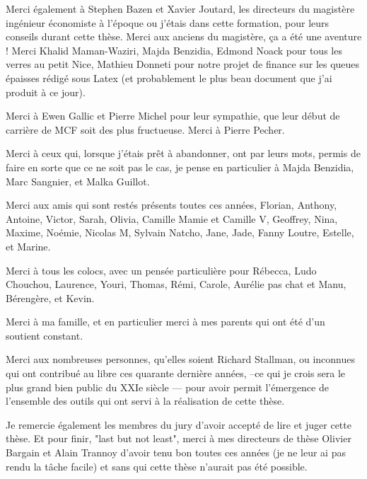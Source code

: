 \medskip


Merci également à Stephen Bazen et Xavier Joutard, les directeurs du magistère ingénieur économiste à l’époque ou j’étais dans cette formation, pour leurs conseils durant cette thèse. Merci aux anciens du magistère, ça a été une aventure ! Merci  Khalid Maman-Waziri,  Majda Benzidia, Edmond Noack pour tous les verres au petit Nice, Mathieu Donneti pour notre projet de finance sur les queues épaisses rédigé sous Latex (et probablement le plus beau document que j’ai produit à ce jour).





\medskip


Merci à Ewen Gallic et Pierre Michel pour leur sympathie, que leur début de carrière de MCF soit des plus fructueuse. Merci à Pierre Pecher.

\medskip


Merci à ceux qui, lorsque j’étais prêt à abandonner, ont par leurs mots, permis de faire en sorte que ce ne soit pas le cas, je pense en particulier à Majda Benzidia, Marc Sangnier, et Malka Guillot.

\medskip


Merci aux amis qui sont restés présents toutes ces années, Florian, Anthony, Antoine, Victor, Sarah, Olivia, Camille  Mamie et Camille V, Geoffrey, Nina, Maxime, Noémie,  Nicolas M, Sylvain Natcho, Jane, Jade, Fanny Loutre, Estelle, et Marine. 


Merci à tous les colocs, avec un pensée particulière pour Rébecca, Ludo Chouchou, Laurence, Youri,  Thomas, Rémi, Carole, Aurélie pas chat et Manu, Bérengère, et Kevin.


\medskip


Merci à ma famille, et en particulier merci à mes parents qui ont été d’un soutient constant.


\medskip


Merci aux nombreuses personnes, qu’elles soient Richard Stallman, ou inconnues qui ont contribué au libre ces  quarante dernière années, --ce qui je crois sera le plus grand bien public du XXIe siècle — pour avoir permit l’émergence de l’ensemble des outils qui ont servi à la réalisation de cette thèse.


\medskip


Je remercie également les membres du jury d’avoir accepté de lire et juger cette thèse.  Et pour finir, "last but not least", merci à mes directeurs de thèse Olivier Bargain et Alain Trannoy d’avoir tenu bon toutes ces années (je ne leur ai pas rendu la tâche facile) et sans qui cette thèse n’aurait pas été possible.


 


\ifx\isDoubleEmbedded\undefined
\newpage
%

\else \fi


